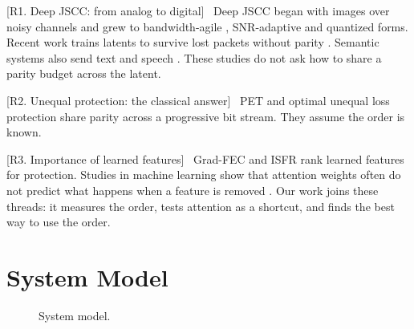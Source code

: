 \documentclass[journal]{IEEEtran}
\newcommand{\beat}[1]{\noindent\textcolor{blue!60!black}{\textsf{\footnotesize [#1]}}\ }
\begin{document}
\beat{R1. Deep JSCC: from analog to digital}
Deep JSCC began with images over noisy channels \cite{bourtsoulatze2019deep} and grew to bandwidth-agile
\cite{kurka2021bandwidth}, SNR-adaptive \cite{xu2022adjscc} and quantized \cite{tung2022deepjsccq} forms.
Recent work trains latents to survive lost packets without parity \cite{esfahanizadeh2026block,
bo2026lgsemcom,wei2026everypacket}. Semantic systems also send text and speech \cite{xie2021deepsc,
weng2021deepscs}. These studies do not ask how to share a parity budget across the latent.

\beat{R2. Unequal protection: the classical answer}
PET \cite{albanese1996pet} and optimal unequal loss protection \cite{mohr2000ulp,dumitrescu2004optimal,
hamzaoui2005optimized} share parity across a progressive bit stream. They assume the order is known.

\beat{R3. Importance of learned features}
Grad-FEC \cite{uyanik2023gradfec} and ISFR \cite{zhan2026isfr} rank learned features for protection.
Studies in machine learning show that attention weights often do not predict what happens when a
feature is removed \cite{jain2019attention,morcos2018single}. Our work joins these threads: it measures
the order, tests attention as a shortcut, and finds the best way to use the order.

\section{System Model}\label{sec:model}

\begin{figure}[t]\centering
{}
\caption{System model.}\label{fig:system}
\end{figure}
\end{document}
